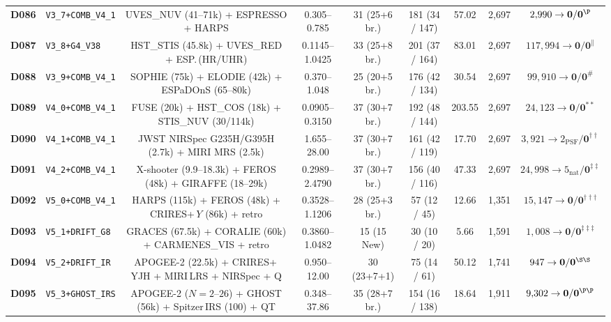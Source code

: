 \documentclass[twocolumn,10pt]{article}
\begin{document}
\begin{table}[t]
{\begin{tabular}{llccccccc}
\textbf{D086} & \texttt{V3\_7+COMB\_V4\_1} & UVES\_NUV (41--71k) + ESPRESSO + HARPS & 0.305--0.785 & 31 (25+6 br.) & 181 (34 / 147) & 57.02 & 2,697 & $2{,}990 \rightarrow \mathbf{0} / \mathbf{0}^{\P}$ \\
\textbf{D087} & \texttt{V3\_8+G4\_V38} & HST\_STIS (45.8k) + UVES\_RED + ESP.\,(HR/UHR) & 0.1145--1.0425 & 33 (25+8 br.) & 201 (37 / 164) & 83.01 & 2,697 & $117{,}994 \rightarrow \mathbf{0} / \mathbf{0}^{\parallel}$ \\
\textbf{D088} & \texttt{V3\_9+COMB\_V4\_1} & SOPHIE (75k) + ELODIE (42k) + ESPaDOnS (65--80k) & 0.370--1.048 & 25 (20+5 br.) & 176 (42 / 134) & 30.54 & 2,697 & $99{,}910 \rightarrow \mathbf{0} / \mathbf{0}^{\#}$ \\
\textbf{D089} & \texttt{V4\_0+COMB\_V4\_1} & FUSE (20k) + HST\_COS (18k) + STIS\_NUV (30/114k) & 0.0905--0.3150 & 37 (30+7 br.) & 192 (48 / 144) & 203.55 & 2,697 & $24{,}123 \rightarrow \mathbf{0} / \mathbf{0}^{\ast\ast}$ \\
\textbf{D090} & \texttt{V4\_1+COMB\_V4\_1} & JWST NIRSpec G235H/G395H (2.7k) + MIRI MRS (2.5k) & 1.655--28.00 & 37 (30+7 br.) & 161 (42 / 119) & 17.70 & 2,697 & $3{,}921 \rightarrow 2_{\mathrm{PSF}} / \mathbf{0}^{\dagger\dagger}$ \\
\textbf{D091} & \texttt{V4\_2+COMB\_V4\_1} & X-shooter (9.9--18.3k) + FEROS (48k) + GIRAFFE (18--29k) & 0.2989--2.4790 & 37 (30+7 br.) & 156 (40 / 116) & 47.33 & 2,697 & $24{,}998 \rightarrow 5_{\mathrm{nat}} / \mathbf{0}^{\ddagger\ddagger}$ \\
\textbf{D092} & \texttt{V5\_0+COMB\_V4\_1} & HARPS (115k) + FEROS (48k) + CRIRES+\,$Y$ (86k) + retro & 0.3528--1.1206 & 28 (25+3 br.) & 57 (12 / 45) & 12.66 & 1,351 & $15{,}147 \rightarrow \mathbf{0} / \mathbf{0}^{\dagger\dagger\dagger}$ \\
\textbf{D093} & \texttt{V5\_1+DRIFT\_G8} & GRACES (67.5k) + CORALIE (60k) + CARMENES\_VIS + retro & 0.3860--1.0482 & 15 (15 New) & 30 (10 / 20) & 5.66 & 1,591 & $1{,}008 \rightarrow \mathbf{0} / \mathbf{0}^{\ddagger\ddagger\ddagger}$ \\
\textbf{D094} & \texttt{V5\_2+DRIFT\_IR} & APOGEE-2 (22.5k) + CRIRES+\,YJH + MIRI\,LRS + NIRSpec + Q & 0.950--12.00 & 30 (23+7+1) & 75 (14 / 61) & 50.12 & 1,741 & $947 \rightarrow \mathbf{0} / \mathbf{0}^{\S\S}$ \\
\textbf{D095} & \texttt{V5\_3+GHOST\_IRS} & APOGEE-2 ($N=2\text{--}26$) + GHOST (56k) + Spitzer\,IRS (100) + QT & 0.348--37.86 & 35 (28+7 br.) & 154 (16 / 138) & 18.64 & 1,911 & $9{,}302 \rightarrow \mathbf{0} / \mathbf{0}^{\P\P}$ \\

\end{tabular}}
\end{table}
\end{document}
